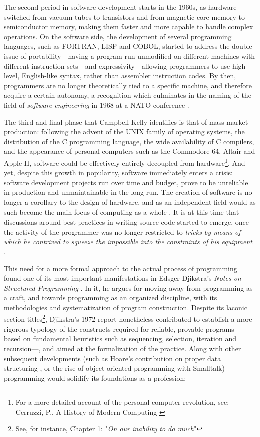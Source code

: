 The second period in software development starts in the 1960s, as hardware switched from vacuum tubes to transistors and from magnetic core memory to semiconductor memory, making them faster and more capable to handle complex operations.  On the software side, the development of several programming languages, such as FORTRAN, LISP and COBOL, started to address the double issue of portability—having a program run unmodified on different machines with different instruction sets—and expressivity—allowing programmers to use high-level, English-like syntax, rather than assembler instruction codes. By then, programmers are no longer theoretically tied to a specific machine, and therefore acquire a certain autonomy, a recognition which culminates in the naming of the field of \emph{software engineering} in 1968 at a NATO conference \citep{randell_nato_1996}.

The third and final phase that Campbell-Kelly identifies is that of mass-market production: following the advent of the UNIX family of operating systems, the distribution of the C programming language, the wide availability of C compilers, and the appearance of personal computers such as the Commodore 64, Altair and Apple II, software could be effectively entirely decoupled from hardware\footnote{For a more detailed account of the personal computer revolution, see: Cerruzzi, P., A History of Modern Computing \citep{ceruzzi_history_2003}}. And yet, despite this growth in popularity, software immediately enters a crisis: software development projects run over time and budget, prove to be unreliable in production and unmaintainable in the long-run. The creation of software is no longer a corollary to the design of hardware, and as an independent field would as such become the main focus of computing as a whole \citep{ceruzzi_history_2003}. It is at this time that discussions around best practices in writing source code started to emerge, once the activity of the programmer was no longer restricted to \emph{tricks by means of which he contrived to squeeze the impossible into the constraints of his equipment} \citep{dijkstra_humble_2007}.

This need for a more formal approach to the actual process of programming found one of its most important manifestations in Edsger Djikstra's \emph{Notes on Structured Programming} \citep{dijkstra_chapter_1972}. In it, he argues for moving away from programming as a craft, and towards programming as an organized discipline, with its methodologies and systematization of program construction. Despite its laconic section titles\footnote{See, for instance, Chapter 1: "\emph{On our inability to do much}"}, Djikstra's 1972 report nonetheless contributed to establish a more rigorous typology of the constructs required for reliable, provable programs—based on fundamental heuristics such as sequencing, selection, iteration and recursion—, and aimed at the formalization of the practice. Along with other subsequent developments (such as Hoare's contribution on proper data structuring \citep{hoare_chapter_1972}, or the rise of object-oriented programming with Smalltalk) programming would solidify its foundations as a profession:

